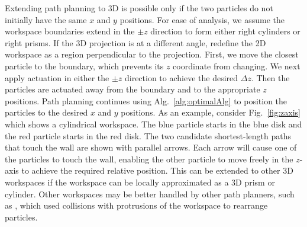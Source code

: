 Extending path planning to 3D is possible only if the two particles do not initially have the same $x$ and $y$ positions.
For ease of analysis, we assume the workspace boundaries extend in the $\pm z$ direction to form either right cylinders or right prisms.
If the 3D projection is at a different angle, redefine the 2D workspace as a region perpendicular to the projection.
 First, we move the closest particle to the boundary, which prevents its $z$ coordinate from changing.  
 We next apply actuation in either the $\pm z$ direction to achieve the desired $\Delta z$.
 Then the particles are actuated away from the boundary and to the appropriate $z$ positions.
 Path planning continues using Alg.~\ref{alg:optimalAlg} to position the particles to the desired $x$ and $y$ positions. 
 As an example, consider Fig.~\ref{fig:zaxis} which shows a cylindrical workspace.
 The blue particle starts in the blue disk and the red particle starts in the red disk. 
 The two candidate shortest-length paths that touch the wall are shown with parallel arrows. 
Each arrow will cause one of the particles to touch the wall, enabling the other particle to move freely in the  $z$-axis to achieve the required relative position.
This can be extended to other 3D workspaces if the workspace can be locally approximated as a 3D prism or cylinder. Other workspaces may be better handled by other path planners, such as \cite{AaronManipulation2013}, which used  collisions with  protrusions of the workspace to rearrange particles.








